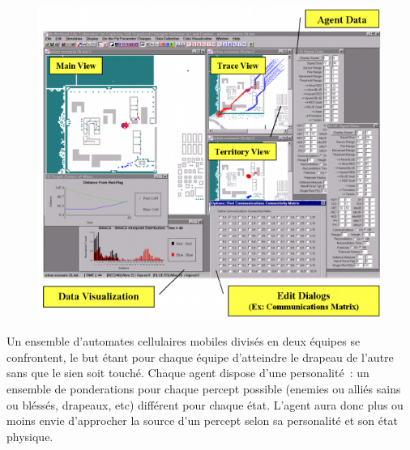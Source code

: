 \documentclass{article}
\begin{document}
\begin{center}
\begin{figure}[H]
	\begin{centering}
	\includegraphics[width=0.9\linewidth]{../ressources/Einstein}
	\caption{}
	\end{centering}
\end{figure}
\cite{simu_guerre,ilachinski1994,ilachinski1999}
\end{center}

Un ensemble d'automates cellulaires mobiles divisés en deux équipes se confrontent, le but étant pour chaque équipe d'atteindre le drapeau de l'autre sans que le sien soit touché. Chaque agent dispose d'une personalité~: un ensemble de ponderations pour chaque percept possible (enemies ou alliés sains ou bléssés, drapeaux, etc) différent pour chaque état. L'agent aura donc plus ou moins envie d'approcher la source d'un percept selon sa personalité et son état physique.
\end{document}
